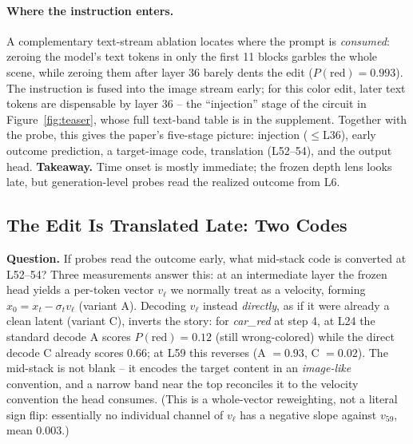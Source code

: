 \paragraph{Where the instruction enters.} A complementary text-stream
ablation locates where the prompt is \emph{consumed}: zeroing the model's
text tokens in only the first 11 blocks garbles the whole scene, while
zeroing them after layer 36 barely dents the edit ($P(\text{red}){=}0.993$).
The instruction is fused into the image stream early; for this color edit,
later text tokens are dispensable by layer 36 -- the ``injection'' stage of the circuit in
Figure~\ref{fig:teaser}, whose full text-band table is in the supplement.
Together with the probe, this gives the paper's five-stage picture:
injection ($\le$L36), early outcome prediction, a target-image code, translation
(L52--54), and the output head.
\noindent\textbf{Takeaway.} Time onset is mostly immediate; the frozen depth
lens looks late, but generation-level probes read the realized outcome from L6.

\subsection{The Edit Is Translated Late: Two Codes}\label{sec:translate}

\noindent\textbf{Question.} If probes read the outcome early, what mid-stack
code is converted at L52--54? Three measurements answer this: at an intermediate layer
the frozen head yields a per-token vector $v_\ell$ we normally treat as a
velocity, forming $\hat x_0 = x_t - \sigma_t v_\ell$ (variant A). Decoding
$v_\ell$ instead \emph{directly}, as if it were already a clean latent
(variant C), inverts the story: for \emph{car\_red} at step 4, at L24 the
standard decode A scores $P(\text{red}){=}0.12$ (still wrong-colored)
while the direct decode C already scores $0.66$; at L59 this reverses (A
$=0.93$, C $=0.02$). The mid-stack is not blank -- it encodes the target
content in an \emph{image-like} convention, and a narrow band near the top
reconciles it to the velocity convention the head consumes. (This is a
whole-vector reweighting, not a literal sign flip: essentially no
individual channel of $v_\ell$ has a negative slope against $v_{59}$, mean
$0.003$.)

